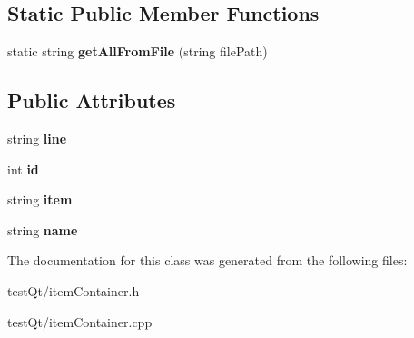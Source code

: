 \subsection*{Static Public Member Functions}
\begin{DoxyCompactItemize}
\item 
\hypertarget{classitem_container_a0351451d4184fb40c105d148d1e36887}{}\label{classitem_container_a0351451d4184fb40c105d148d1e36887} 
static string {\bfseries get\+All\+From\+File} (string file\+Path)
\end{DoxyCompactItemize}
\subsection*{Public Attributes}
\begin{DoxyCompactItemize}
\item 
\hypertarget{classitem_container_a0b93ed79558f99be509bc18448aec165}{}\label{classitem_container_a0b93ed79558f99be509bc18448aec165} 
string {\bfseries line}
\item 
\hypertarget{classitem_container_a6204c656f7f14a0778184434b1497d89}{}\label{classitem_container_a6204c656f7f14a0778184434b1497d89} 
int {\bfseries id}
\item 
\hypertarget{classitem_container_ae5891ff00750ee638fa2e115195df850}{}\label{classitem_container_ae5891ff00750ee638fa2e115195df850} 
string {\bfseries item}
\item 
\hypertarget{classitem_container_a81a860050cf20d1fd03cb78d16c294e7}{}\label{classitem_container_a81a860050cf20d1fd03cb78d16c294e7} 
string {\bfseries name}
\end{DoxyCompactItemize}


The documentation for this class was generated from the following files\+:\begin{DoxyCompactItemize}
\item 
test\+Qt/item\+Container.\+h\item 
test\+Qt/item\+Container.\+cpp\end{DoxyCompactItemize}
